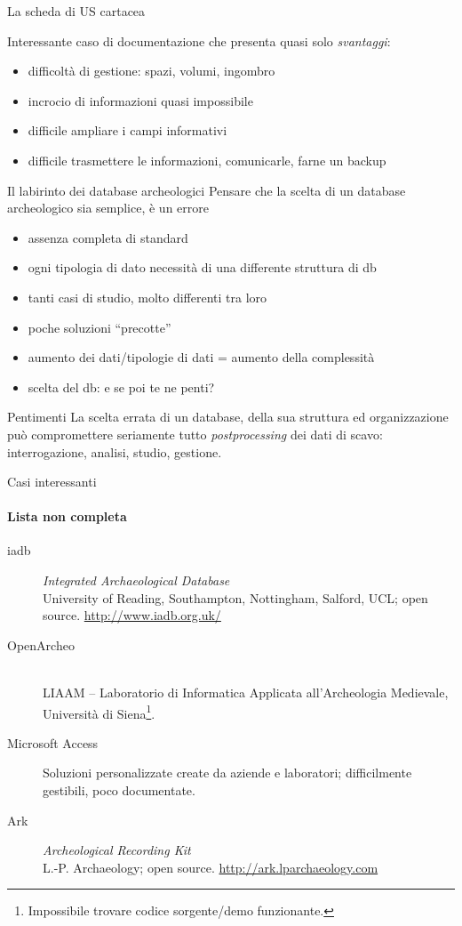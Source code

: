 \documentclass{beamer}
\begin{document}
\begin{frame}{La scheda di US cartacea}
\begin{multicols}{2}[][]
				\columnbreak
				Interessante caso di documentazione che presenta quasi solo \emph{svantaggi}:
				\begin{itemize}
					\item difficoltà di gestione: spazi, volumi, ingombro
					\item incrocio di informazioni quasi impossibile
					\item difficile ampliare i campi informativi
					\item difficile trasmettere le informazioni, comunicarle, farne un backup
				\end{itemize}
			\end{multicols}
		\end{frame}

		\begin{frame}{Il labirinto dei database archeologici}
			Pensare che la scelta di un database archeologico sia semplice, è un errore
			\begin{itemize}
				\item assenza completa di standard
				\item ogni tipologia di dato necessità di una differente struttura di db
				\item tanti casi di studio, molto differenti tra loro
				\item poche soluzioni ``precotte''
				\item aumento dei dati/tipologie di dati = aumento della complessità
				\item scelta del db: e se poi te ne penti?
			\end{itemize}
		\end{frame}

		\begin{frame}{Pentimenti}
			La scelta errata di un database, della sua struttura ed organizzazione può compromettere seriamente tutto \emph{postprocessing} dei dati di scavo: interrogazione, analisi, studio, gestione.
		\end{frame}

		\begin{frame}{Casi interessanti}
		\framesubtitle{Lista non completa}
			\begin{description}
				\item[iadb]\emph{Integrated Archaeological Database}\\University of Reading, Southampton, Nottingham, Salford, UCL; open source. \url{http://www.iadb.org.uk/}
				\item[OpenArcheo]\\LIAAM -- Laboratorio di Informatica Applicata all'Archeologia Medievale, Università di Siena\footnote{Impossibile trovare codice sorgente/demo funzionante.}.
				\item[Microsoft Access]Soluzioni personalizzate create da aziende e laboratori; difficilmente gestibili, poco documentate.
				\item[Ark]\emph{Archeological Recording Kit}\\L.-P. Archaeology; open source. \url{http://ark.lparchaeology.com}
			\end{description}
		\end{frame}
\end{document}
